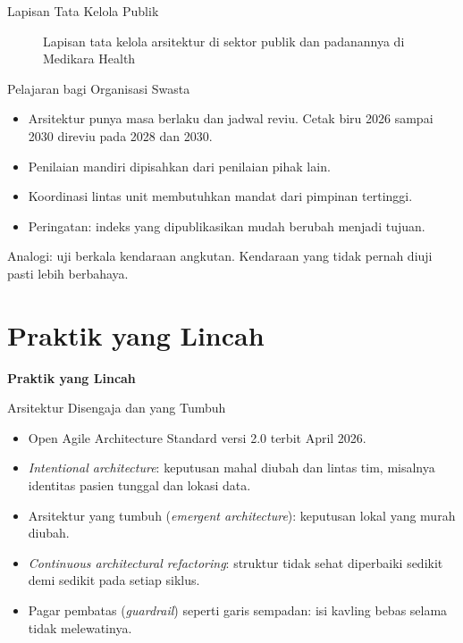\documentclass[aspectratio=169, table, 12pt]{beamer}
\begin{document}
\begin{frame}{{\Large Lapisan Tata Kelola Publik}}
  \centering
  \begin{figure}
    \resizebox{!}{0.59\textheight}{}
    \caption{Lapisan tata kelola arsitektur di sektor publik dan padanannya di Medikara Health}
  \end{figure}
\end{frame}

\begin{frame}{{\Large Pelajaran bagi Organisasi Swasta}}
  \small
  \vspace{6pt}
  \begin{itemize}
    \item Arsitektur punya masa berlaku dan jadwal reviu. Cetak biru 2026 sampai 2030 direviu pada 2028
          dan 2030.
    \item Penilaian mandiri dipisahkan dari penilaian pihak lain.
    \item Koordinasi lintas unit membutuhkan mandat dari pimpinan tertinggi.
    \item Peringatan: indeks yang dipublikasikan mudah berubah menjadi tujuan.
  \end{itemize}
  \vspace{6pt}
  Analogi: uji berkala kendaraan angkutan. Kendaraan yang tidak pernah diuji pasti lebih berbahaya.
\end{frame}

\section{Praktik yang Lincah}

\begin{frame}{\hfill}
  \centering
  \Huge{\textbf{Praktik yang Lincah}}
\end{frame}

\begin{frame}{{\Large Arsitektur Disengaja dan yang Tumbuh}}
  \small
  \vspace{4pt}
  \begin{itemize}
    \item Open Agile Architecture Standard versi 2.0 terbit April 2026.
    \item \textit{Intentional architecture}: keputusan mahal diubah dan lintas tim, misalnya identitas
          pasien tunggal dan lokasi data.
    \item Arsitektur yang tumbuh (\textit{emergent architecture}): keputusan lokal yang murah diubah.
    \item \textit{Continuous architectural refactoring}: struktur tidak sehat diperbaiki sedikit demi
          sedikit pada setiap siklus.
    \item Pagar pembatas (\textit{guardrail}) seperti garis sempadan: isi kavling bebas selama tidak
          melewatinya.
  \end{itemize}
\end{frame}
\end{document}
